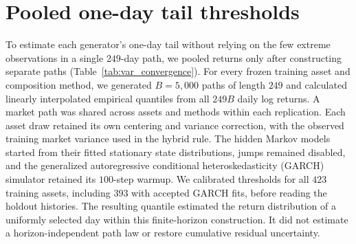 \begin{table}[H]
  \centering
  \caption{\textbf{Paired control for residual centering on common
    training assets.} Native and centered results use the same
    $393$ assets and $100$ paths per asset. Centered paths have zero
    residual mean over $2{,}766$ observations. Kolmogorov--Smirnov (KS)
    and Anderson--Darling (AD) columns give non-rejection percentages
    at $\alpha=0.05$; higher values indicate closer empirical fit.
    $W_1$ is median Wasserstein-1 distance, and $|\hat\alpha-\alpha|$
    is median absolute ordinary least squares (OLS) intercept error, both in
    $\mathrm{yr}^{-1}$; lower values indicate closer agreement.
    Naive and hybrid already center each residual path.
    JumpHMM denotes the hidden Markov generator, with jumps disabled;
    SIM denotes the single-index model, and GARCH denotes generalized
    autoregressive conditional heteroskedasticity.}
  \label{tab:centering_control}
  \footnotesize
  \setlength{\tabcolsep}{3pt}
  
\end{table}


\clearpage
\section{Pooled one-day tail thresholds}
\label{sec:supp-var-ensemble}

To estimate each generator's one-day tail without relying on the few
extreme observations in a single $249$-day path, we pooled returns
only after constructing separate paths
(Table~\ref{tab:var_convergence}). For every frozen training
asset and composition method, we generated $B=5{,}000$ paths of
length $249$ and calculated linearly interpolated empirical quantiles
from all $249B$ daily log returns. A market path was shared across
assets and methods within each replication. Each asset draw retained
its own centering and variance correction, with the observed training
market variance used in the hybrid rule. The hidden Markov models
started from their fitted stationary state distributions, jumps
remained disabled, and the generalized autoregressive conditional
heteroskedasticity (GARCH) simulator retained its $100$-step warmup.
We calibrated thresholds for all $423$ training assets, including
$393$ with accepted GARCH fits, before reading the holdout histories.
The resulting quantile estimated the return distribution of a
uniformly selected day within this finite-horizon construction.
It did not estimate a horizon-independent path law or restore
cumulative residual uncertainty.

